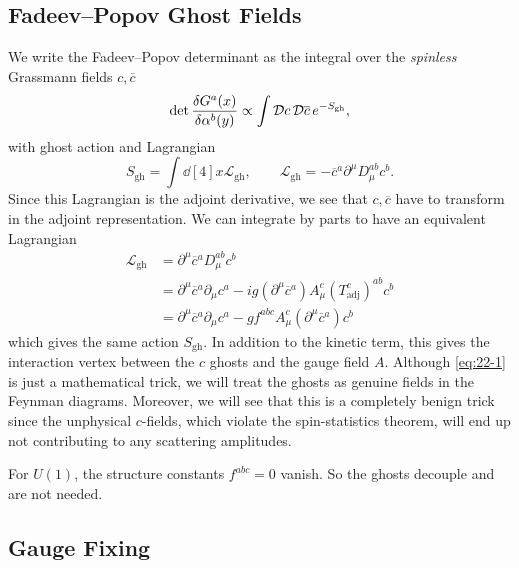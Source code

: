 
\subsection{Fadeev--Popov Ghost Fields}%
\label{sub:fadeev_popov_ghost_fields}

We write the Fadeev--Popov determinant as the integral over the \emph{spinless} Grassmann fields $c, \overline{c}{}$
\begin{equation}
  \label{eq:22-1}
  \det \frac{\delta G^{a}(x)}{\delta \alpha^{b}(y)} \propto \int \mathop{\mathcal{D} c} \mathop{\mathcal{D} \overline{c}{}} e^{-S_{\text{gh}}},
\end{equation}
with ghost action and Lagrangian
\begin{equation}
  S_{\text{gh}} = \int \dd[4]{x} \mathscr{L}_{\text{gh}}, \qquad \mathscr{L}_{\text{gh}} = -\overline{c}{}^{a} \partial^{\mu} D_{\mu} ^{ab} c^{b}.
\end{equation}
Since this Lagrangian is the adjoint derivative, we see that $c, \overline{c}{}$ have to transform in the adjoint representation.
We can integrate by parts to have an equivalent Lagrangian
\begin{align}
  \mathscr{L}_{\text{gh}} &= \partial^{\mu} \overline{c}{}^{a} D^{ab}_{\mu} c^{b} \\
			  &= \partial^{\mu} \overline{c}{}^{a} \partial_{\mu} c^{a} - i g (\partial^{\mu} \overline{c}{}^{a}) A^{c}_{\mu} (T^{c} _{\text{adj}})^{ab} c^{b} \\
			  &= \partial^{\mu} \overline{c}{}^{a} \partial_{\mu} c^{a} - g f^{abc} A_{\mu} ^{c} (\partial^{\mu} \overline{c}{}^{a}) c^{b}
\end{align}
which gives the same action $S_{\text{gh}}$.
In addition to the kinetic term, this gives the interaction vertex between the $c$ ghosts and the gauge field $A$.
Although \eqref{eq:22-1} is just a mathematical trick, we will treat the ghosts as genuine fields in the Feynman diagrams. Moreover, we will see that this is a completely benign trick since the unphysical $c$-fields, which violate the spin-statistics theorem, will end up not contributing to any scattering amplitudes.

For $U(1)$, the structure constants $f^{abc} = 0$ vanish. So the ghosts decouple and are not needed.

\subsection{Gauge Fixing}%
\label{sub:gauge_fixing}

